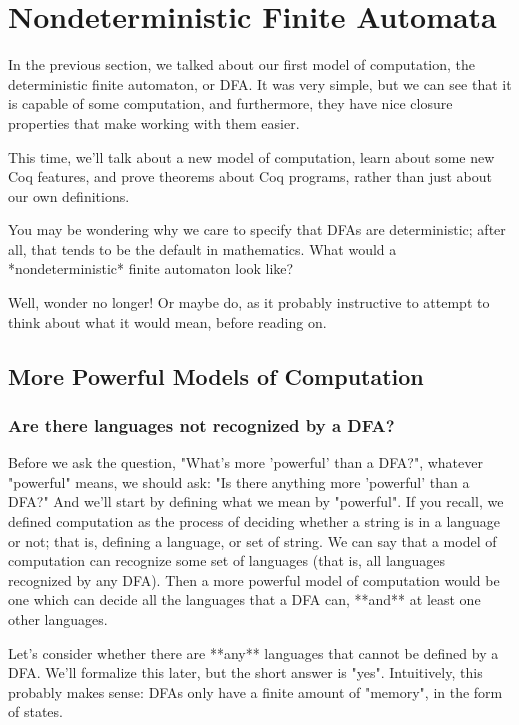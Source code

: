 \section{Nondeterministic Finite Automata}

In the previous section, we talked about our first model of computation, the deterministic finite automaton, or DFA.
It was very simple, but we can see that it is capable of some computation, and furthermore, they have nice closure properties that make working with them easier.

This time, we'll talk about a new model of computation, learn about some new Coq features, and prove theorems about Coq programs, rather than just about our own definitions.

You may be wondering why we care to specify that DFAs are deterministic; after all, that tends to be the default in mathematics.
What would a *nondeterministic* finite automaton look like?

Well, wonder no longer!
Or maybe do, as it probably instructive to attempt to think about what it would mean, before reading on.

\subsection{More Powerful Models of Computation}

\subsubsection{Are there languages not recognized by a DFA?}

Before we ask the question, "What's more 'powerful' than a DFA?", whatever "powerful" means, we should ask: "Is there anything more 'powerful' than a DFA?"
And we'll start by defining what we mean by "powerful".
If you recall, we defined computation as the process of deciding whether a string is in a language or not; that is, defining a language, or set of string.
We can say that a model of computation can recognize some set of languages (that is, all languages recognized by any DFA).
Then a more powerful model of computation would be one which can decide all the languages that a DFA can, **and** at least one other languages.

Let's consider whether there are **any** languages that cannot be defined by a DFA.
We'll formalize this later, but the short answer is "yes".
Intuitively, this probably makes sense: DFAs only have a finite amount of "memory", in the form of states.

